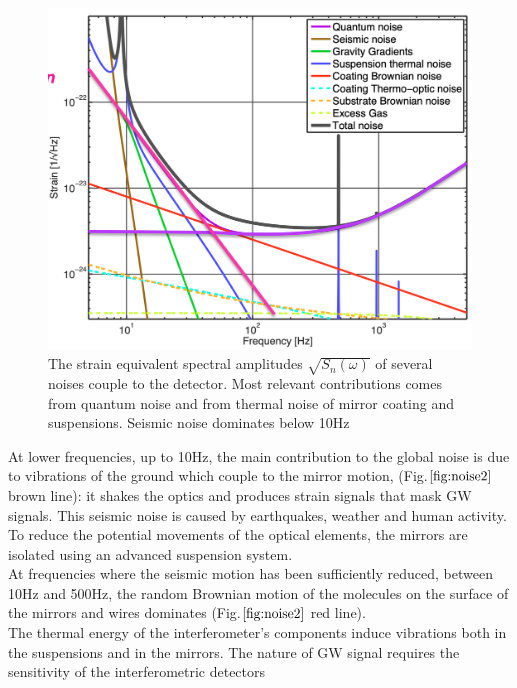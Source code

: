 \documentclass[binding=0.6cm, LaM]{sapthesis}
\begin{document}
		\begin{figure}[H]
                        \includegraphics[scale=0.3]{noise2}
                        \centering
                        \caption{The strain equivalent spectral amplitudes $\sqrt{S_n(\omega)}$ 
				 of several noises couple to the detector. 
				 Most relevant contributions comes from quantum noise 
				 and from thermal noise of mirror coating and suspensions. 
				 Seismic noise dominates below 10Hz}
                        \label{fig:noise2}
                \end{figure}
        At lower frequencies, up to 10Hz, the main contribution to the global noise
        is due to vibrations of the ground which couple to the mirror motion, (Fig.$\ref{fig:noise2}$ brown line): 
	it shakes the optics and produces strain signals that mask GW signals. 
        This seismic noise is caused by earthquakes, weather and human activity.
        To reduce the potential movements of the optical elements,
        the mirrors are isolated using an advanced suspension system. \\
        At frequencies where the seismic motion has been sufficiently reduced,
        between 10Hz and 500Hz, the random Brownian motion of the molecules on the surface of the mirrors and wires dominates (Fig.$\ref{fig:noise2}$ red line). \\
        The thermal energy of the interferometer’s components induce vibrations both in the suspensions and in the mirrors.
        The nature of GW signal requires the sensitivity of the interferometric detectors
\end{document}
